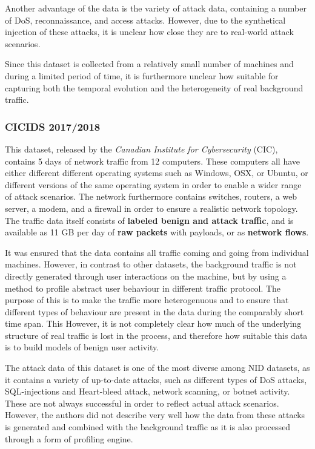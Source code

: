 Another advantage of the data is the variety of attack data, containing a number of DoS, reconnaissance, and access attacks. However, due to the synthetical injection of these attacks, it is unclear how close they are to real-world attack scenarios.

Since this dataset is collected from a relatively small number of machines and during a limited period of time, it is furthermore unclear how suitable for capturing both the temporal evolution and the heterogeneity of real background traffic.

\subsubsection*{CICIDS 2017/2018 \cite{gharib2016evaluation}\cite{sharafaldin2018towards}}

This dataset, released by the \textit{Canadian Institute for Cybersecurity} (CIC), contains 5 days of network traffic from 12 computers. These computers all have either different different operating systems such as Windows, OSX, or Ubuntu, or different versions of the same operating system in order to enable a wider range of attack scenarios. The network  furthermore contains switches, routers, a web server, a modem, and a firewall in order to ensure a realistic network topology. The traffic data itself consists of \textbf{labeled benign and attack traffic}, and is available as 11 GB per day of \textbf{raw packets} with payloads, or as \textbf{network flows}. 

It was ensured that the data contains all traffic coming and going from individual machines. However, in contrast to other datasets, the background traffic is not directly generated through user interactions on the machine, but by using a method to profile abstract user behaviour in different traffic protocol. The purpose of this is to make the traffic more heterogenuous and to ensure that different types of behaviour are present in the data during the comparably short time span. This  However, it is not completely clear how much of the underlying structure of real traffic is lost in the process, and therefore how suitable this data is to build models of benign user activity.

The attack data of this dataset is one of the most diverse among NID datasets, as it contains a variety of up-to-date attacks, such as different types of DoS attacks, SQL-injections and Heart-bleed attack, network scanning, or botnet activity. These are not always successful in order to reflect actual attack scenarios. However, the authors did not describe very well how the data from these attacks is generated and combined with the background traffic as it is also processed through a form of profiling engine. 

